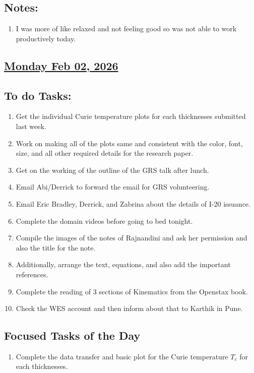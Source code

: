 \subsection*{Notes:}
\begin{enumerate}
    \item I was more of like relaxed and not feeling good so was not able to work productively today. 
\end{enumerate}
\subsection*{\underline{Monday Feb 02, 2026}}
\subsection*{To do Tasks:}
\begin{enumerate}
     \item Get the individual Curie temperature plots for each thicknesses submitted last week.\cmark
     \item Work on making all of the plots same and consistent with the color, font, size, and all other required details for the research paper. \cmark
     \item Get on the working of the outline of the GRS talk after lunch. \xmark
     \item Email Abi/Derrick to forward the email for GRS volunteering. \cmark
     \item Email Eric Bradley, Derrick, and Zabrina about the details of I-20 issuance.\xmark
     \item Complete the domain videos before going to bed tonight.\xmark
     \item Compile the images of the notes of Rajnandini and ask her permission and also the title for the note.\xmark
     \item Additionally, arrange the text, equations, and also add the important references.\xmark
     \item Complete the reading of 3 sections of Kinematics from the Openstax book. \cmark 
     \item Check the WES account and then inform about that to Karthik in Pune.\cmark
\end{enumerate}
\subsection*{Focused Tasks of the Day}
\begin{enumerate}[\ding{227}]  %
    \item Complete the data transfer and basic plot for the Curie temperature $T_c$ for each thicknesses.
\end{enumerate}
